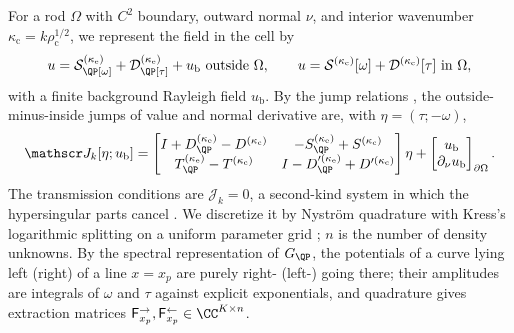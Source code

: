For a rod $\Omega$ with $C^2$ boundary, outward normal $\nu$, and interior
wavenumber $\kappa_{\mathrm c}=k\rho_{\mathrm c}^{1/2}$, we represent the field in
the cell by
\begin{equation}\label{eq:cell-rep}
  u=\mathcal S^{(\kappa_{\mathrm e})}_\QP[\omega]+\mathcal D^{(\kappa_{\mathrm e})}_\QP[\tau]
  +u_{\mathrm b}\ \text{outside }\Omega,\qquad
  u=\mathcal S^{(\kappa_{\mathrm c})}[\omega]+\mathcal D^{(\kappa_{\mathrm c})}[\tau]
  \ \text{in }\Omega,
\end{equation}
with a finite background Rayleigh field $u_{\mathrm b}$. By the jump relations
\cite{ColtonKress1983,Kress1991}, the outside-minus-inside jumps of value and
normal derivative are, with $\eta=(\tau;-\omega)$,
\begin{equation}\label{eq:jump-operator}
  \mathscr J_k[\eta;u_{\mathrm b}]=
  \begin{bmatrix}
    I+D^{(\kappa_{\mathrm e})}_\QP-D^{(\kappa_{\mathrm c})}&-S^{(\kappa_{\mathrm e})}_\QP+S^{(\kappa_{\mathrm c})}\\
    T^{(\kappa_{\mathrm e})}_\QP-T^{(\kappa_{\mathrm c})}&I-D'^{(\kappa_{\mathrm e})}_\QP+D'^{(\kappa_{\mathrm c})}
  \end{bmatrix}\eta
  +\begin{bmatrix}u_{\mathrm b}\\ \partial_\nu u_{\mathrm b}\end{bmatrix}_{\partial\Omega}.
\end{equation}
The transmission conditions are $\mathscr J_k=0$, a second-kind system in which
the hypersingular parts cancel \cite{DominguezLyonTurc2016}. We discretize it by
Nystr\"om quadrature with Kress's logarithmic splitting on a uniform parameter
grid \cite{Kress1991,HaoBarnettMartinssonYoung2014}; $n$ is the number of density
unknowns. By the spectral representation of $G_\QP$, the potentials of a curve
lying left (right) of a line $x=x_p$ are purely right- (left-) going there;
their amplitudes are integrals of $\omega$ and $\tau$ against explicit
exponentials, and quadrature gives extraction matrices
$\mathsf F^{\rightarrow}_{x_p},\mathsf F^{\leftarrow}_{x_p}\in\CC^{K\times n}$.

